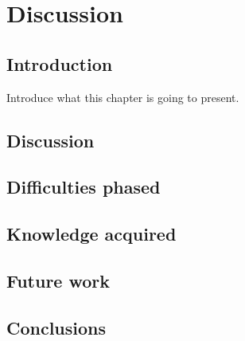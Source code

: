 \chapter{Discussion}

\section{Introduction}
Introduce what this chapter is going to present.
\section{Discussion}

\section{Difficulties phased}

\section{Knowledge acquired}

\section{Future work}

\section{Conclusions}